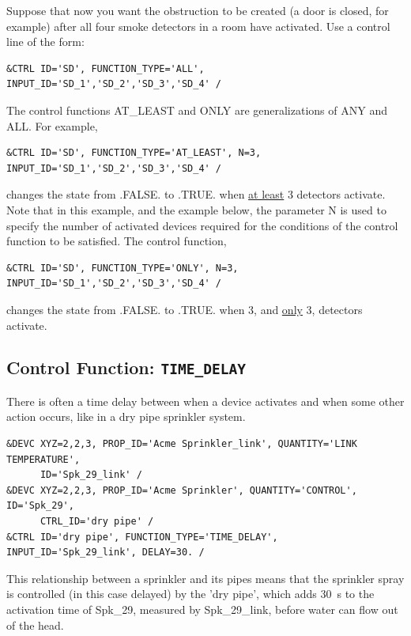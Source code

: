 \documentclass[11pt]{book}
\begin{document}
Suppose that now you want the obstruction to be created (a door is closed, for example) after all
four smoke detectors in a room have activated. Use a control line of the form:

\begin{lstlisting}
&CTRL ID='SD', FUNCTION_TYPE='ALL', INPUT_ID='SD_1','SD_2','SD_3','SD_4' /
\end{lstlisting}

\noindent
The control functions {\ct AT\_LEAST} and {\ct ONLY} are generalizations of {\ct ANY} and {\ct ALL}. For example,

\begin{lstlisting}
&CTRL ID='SD', FUNCTION_TYPE='AT_LEAST', N=3, INPUT_ID='SD_1','SD_2','SD_3','SD_4' /
\end{lstlisting}

\noindent
changes the state from {\ct .FALSE.} to {\ct .TRUE.} when \underline{at least}
3 detectors activate. Note that in this example, and the example below, the parameter {\ct N} is used to
specify the number of activated devices required for the conditions
of the control function to be satisfied. The control function,

\begin{lstlisting}
&CTRL ID='SD', FUNCTION_TYPE='ONLY', N=3, INPUT_ID='SD_1','SD_2','SD_3','SD_4' /
\end{lstlisting}

\noindent
changes the state from {\ct .FALSE.} to {\ct .TRUE.} when 3,
and \underline{only} 3, detectors activate.


\subsection{Control Function: \texorpdfstring{{\tt TIME\_DELAY}}{TIME\_DELAY}}

\label{info:TIME_DELAY}

There is often a time delay between when a device activates and when some other action occurs, like in a dry pipe sprinkler system.

\begin{lstlisting}
&DEVC XYZ=2,2,3, PROP_ID='Acme Sprinkler_link', QUANTITY='LINK TEMPERATURE',
      ID='Spk_29_link' /
&DEVC XYZ=2,2,3, PROP_ID='Acme Sprinkler', QUANTITY='CONTROL', ID='Spk_29',
      CTRL_ID='dry pipe' /
&CTRL ID='dry pipe', FUNCTION_TYPE='TIME_DELAY', INPUT_ID='Spk_29_link', DELAY=30. /
\end{lstlisting}

\noindent
This relationship between a sprinkler and its pipes means that the sprinkler spray is controlled (in this case delayed) by the
{\ct 'dry pipe'}, which adds 30~s to the activation time of {\ct Spk\_29}, measured by  {\ct Spk\_29\_link},
before water can flow out of the head.
\end{document}
